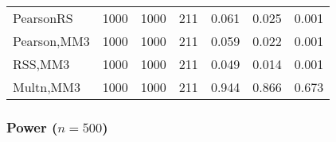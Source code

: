 \documentclass[
]{article}
\begin{document}
\begin{table}[H]
{\begin{tabular}[t]{lrrrrrr}
\hspace{1em}PearsonRS & 1000 & 1000 & 211 & 0.061 & 0.025 & 0.001\\
\hspace{1em}Pearson,MM3 & 1000 & 1000 & 211 & 0.059 & 0.022 & 0.001\\
\hspace{1em}RSS,MM3 & 1000 & 1000 & 211 & 0.049 & 0.014 & 0.001\\
\hspace{1em}Multn,MM3 & 1000 & 1000 & 211 & 0.944 & 0.866 & 0.673\\
\bottomrule
\end{tabular}}
\end{table}

\hypertarget{power-n500-2}{%
\subsubsection{\texorpdfstring{Power
(\(n=500\))}{Power (n=500)}}\label{power-n500-2}}
\end{document}
